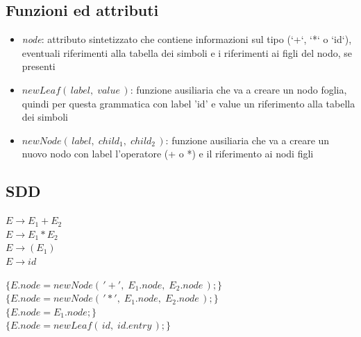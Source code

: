 \documentclass[11pt]{article}
\begin{document}
\subsection*{Funzioni ed attributi}
\begin{itemize}
  \item \textit{node}: attributo sintetizzato che contiene informazioni sul tipo 
  (`+`, `*` o `id`), eventuali riferimenti alla tabella dei simboli e i 
  riferimenti ai figli del nodo, se presenti
  \item $newLeaf(\,label,\; value\,)$: funzione ausiliaria che va a creare 
  un nodo foglia, quindi per questa grammatica con label 'id' e value un 
  riferimento alla tabella dei simboli
  \item $newNode(\, label,\; child_1,\; child_2\,)$: funzione ausiliaria che 
  va a creare un nuovo nodo con label l'operatore (+ o *) e il riferimento
  ai nodi figli
\end{itemize}
\subsection*{SDD}
\begin{center}
  \begin{minipage}[t]{0.29\linewidth}
    $E \rightarrow E_1 + E_2$ \\
    $E \rightarrow E_1 * E_2$ \\
    $E \rightarrow (E_1)$     \\
    $E \rightarrow id$     
  \end{minipage}
  \hspace{0.2cm}
  \begin{minipage}[t]{0.5\linewidth}
    \raggedright
    $\{E.node = newNode(\,'+',\; E_1.node,\; E_2.node\,);\}$ \\
    $\{E.node = newNode(\,'*',\; E_1.node,\; E_2.node\,);\}$ \\
    $\{E.node = E_1.node;\}$ \\
    $\{E.node = newLeaf(\,id,\; id.entry\,);\}$ \\
  \end{minipage}
  \hspace{0.2cm}
\end{center}
\end{document}
